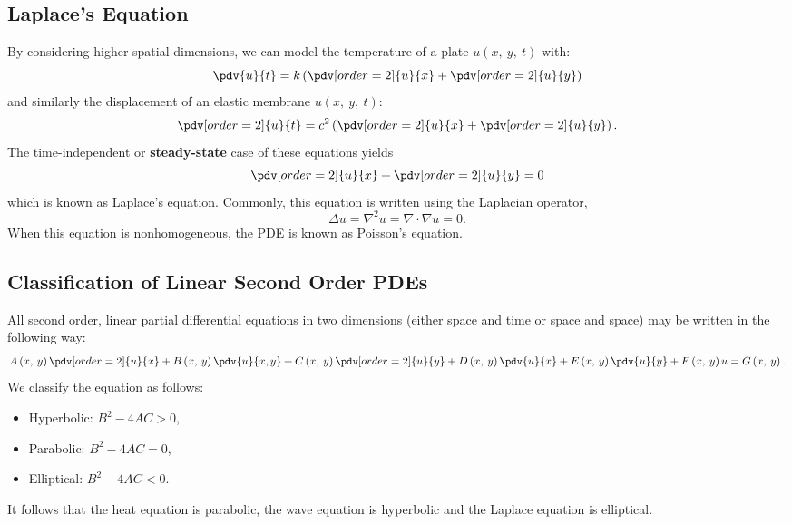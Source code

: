 \documentclass{article}
\begin{document}
\subsection{Laplace's Equation}
By considering higher spatial dimensions, we can model the temperature
of a plate \(u\left( x,\: y,\: t \right)\) with:
\begin{equation*}
    \pdv{u}{t} = k \left( \pdv[order=2]{u}{x} + \pdv[order=2]{u}{y} \right)
\end{equation*}
and similarly the displacement of an elastic membrane \(u\left( x,\: y,\: t \right)\):
\begin{equation*}
    \pdv[order=2]{u}{t} = c^2 \left( \pdv[order=2]{u}{x} + \pdv[order=2]{u}{y} \right).
\end{equation*}
The time-independent or \textbf{steady-state} case of these equations yields
\begin{equation*}
    \pdv[order=2]{u}{x} + \pdv[order=2]{u}{y} = 0
\end{equation*}
which is known as Laplace's equation. Commonly, this equation is written using the Laplacian operator,
\begin{equation*}
    \Delta{u} = \nabla^2 u = \nabla \cdot \nabla u = 0.
\end{equation*}
When this equation is nonhomogeneous, the PDE is known as Poisson's equation.
\subsection{Classification of Linear Second Order PDEs}
All second order, linear partial differential equations in two
dimensions (either space and time or space and space) may be written in
the following way:
\begin{equation*}
    A\left( x,\: y \right) \pdv[order=2]{u}{x} + B\left( x,\: y \right) \pdv{u}{x,y} + C\left( x,\: y \right) \pdv[order=2]{u}{y} + D\left( x,\: y \right) \pdv{u}{x} + E\left( x,\: y \right) \pdv{u}{y} + F\left( x,\: y \right) u = G\left( x,\: y \right).
\end{equation*}
We classify the equation as follows:
\begin{itemize}
    \item Hyperbolic: \(B^2 - 4A C > 0\),
    \item Parabolic: \(B^2 - 4A C = 0\),
    \item Elliptical: \(B^2 - 4A C < 0\).
\end{itemize}
It follows that the heat equation is parabolic, the wave equation is hyperbolic and the Laplace equation is elliptical.
\end{document}
